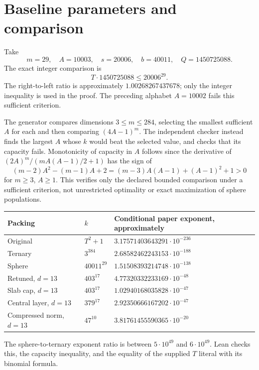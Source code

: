\documentclass[11pt]{article}
\begin{document}
\section{Baseline parameters and comparison}
Take
\[
 m=29,\quad A=10003,\quad s=20006,\quad b=40011,\quad Q=1450725088.
\]
The exact integer comparison is
\[
 T\cdot1450725088\le20006^{29}.
\]
The right-to-left ratio is approximately \(1.00268267437678\);
only the integer inequality is used in the proof.
The preceding alphabet \(A=10002\) fails this sufficient criterion.

The generator compares dimensions \(3\le m\le284\), selecting the
smallest sufficient \(A\) for each and then comparing \((4A-1)^m\).
The independent checker instead finds the largest \(A\) whose \(k\)
would beat the selected value, and checks that its capacity fails.
Monotonicity of capacity in \(A\) follows since the derivative of
\((2A)^m/(mA(A-1)/2+1)\) has the sign of
\[
 (m-2)A^2-(m-1)A+2
 =(m-3)A(A-1)+(A-1)^2+1>0
\]
for \(m\ge3\), \(A\ge1\). This verifies only the declared bounded
comparison under a sufficient criterion, not unrestricted optimality
or exact maximization of sphere populations.

\begin{center}
\begin{tabular}{lll}
\toprule
Packing & \(k\) & Conditional paper exponent, approximately\\
\midrule
Original & \(T^2+1\) & \(3.17571403643291\cdot10^{-236}\)\\
Ternary & \(3^{384}\) & \(2.68582462243153\cdot10^{-188}\)\\
Sphere & \(40011^{29}\) & \(1.51508393214748\cdot10^{-138}\)\\
Retuned, \(d=13\) & \(403^{17}\) & \(4.77320332233169\cdot10^{-48}\)\\
Slab cap, \(d=13\) & \(403^{17}\) & \(1.02940168035828\cdot10^{-47}\)\\
Central layer, \(d=13\) & \(379^{17}\) & \(2.92350666167202\cdot10^{-47}\)\\
Compressed norm, \(d=13\) & \(47^{10}\) & \(3.81761455590365\cdot10^{-20}\)\\
\bottomrule
\end{tabular}
\end{center}
The sphere-to-ternary exponent ratio is between \(5\cdot10^{49}\)
and \(6\cdot10^{49}\). Lean checks this, the capacity inequality,
and the equality of the supplied \(T\) literal with its binomial formula.
\end{document}
